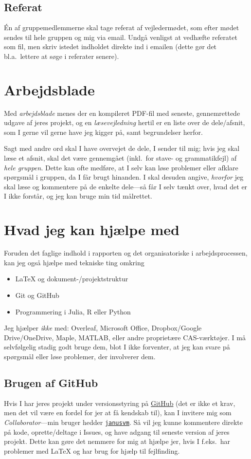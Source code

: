\documentclass[12pt,a4paper,oneside,final]{article}
\begin{document}
\subsection{Referat}
\'En af gruppemedlemmerne skal tage referat af vejledermødet, som efter mødet sendes til hele gruppen og mig via email.
Undgå venligst at vedhæfte referatet som fil, men skriv istedet indholdet direkte ind i emailen (dette gør det bl.a.\ lettere at søge i referater senere).


\clearpage
\section{Arbejdsblade}
\label{sec:arbejdsblade}
Med \emph{arbejdsblade} menes der en kompileret PDF-fil med seneste, gennemrettede udgave af jeres projekt, og en \emph{læsevejledning} hertil er en liste over de dele/afsnit, som I gerne vil gerne have jeg kigger på, samt begrundelser herfor.

Sagt med andre ord skal I have overvejet de dele, I sender til mig;
hvis jeg skal læse et afsnit, skal det være gennemgået (inkl.\ for stave- og grammatikfejl) af \emph{hele gruppen}.
Dette kan ofte medføre, at I selv kan løse problemer eller afklare spørgsmål i gruppen, da I får brugt hinanden.
I skal desuden angive, \emph{hvorfor} jeg skal læse og kommentere på de enkelte dele---så får I selv tænkt over, hvad det er I ikke forstår, og jeg kan bruge min tid målrettet.


\section{Hvad jeg kan hjælpe med}
Foruden det faglige indhold i rapporten og det organisatoriske i arbejdsprocessen, kan jeg også hjælpe med tekniske ting omkring
\begin{itemize}
\item \LaTeX{} og dokument-/projektstruktur
\item Git og GitHub
\item Programmering i Julia, R eller Python
\end{itemize}
Jeg hjælper \emph{ikke} med: Overleaf, Microsoft Office, Dropbox/Google Drive/OneDrive, Maple, MATLAB, eller andre proprietære CAS-værktøjer.
I må selvfølgelig stadig godt bruge dem, blot I ikke forventer, at jeg kan svare på spørgsmål eller løse problemer, der involverer dem.

\subsection{Brugen af GitHub}
Hvis I har jeres projekt under versionsstyring på \href{https://github.com}{GitHub} (det er ikke et krav, men det vil være en fordel for jer at få kendskab til), kan I invitere mig som \emph{Collaborator}---min bruger hedder \href{https://github.com/janusvm}{\texttt{janusvm}}.
Så vil jeg kunne kommentere direkte på kode, oprette/deltage i Issues, og have adgang til seneste version af jeres projekt.
Dette kan gøre det nemmere for mig at hjælpe jer, hvis I f.eks.\ har problemer med \LaTeX{} og har brug for hjælp til fejlfinding.
\end{document}
